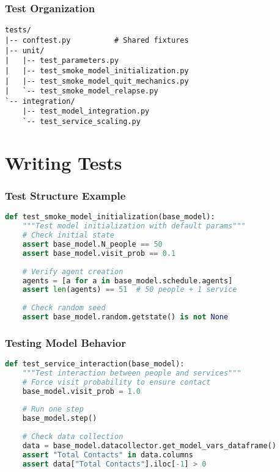 \documentclass{beamer}
\begin{document}
\begin{frame}[fragile]
    \frametitle{Test Organization}
    \begin{lstlisting}[basicstyle=\ttfamily\small]
tests/
|-- conftest.py          # Shared fixtures
|-- unit/
|   |-- test_parameters.py
|   |-- test_smoke_model_initialization.py
|   |-- test_smoke_model_quit_mechanics.py
|   `-- test_smoke_model_relapse.py
`-- integration/
    |-- test_model_integration.py
    `-- test_service_scaling.py
    \end{lstlisting}
\end{frame}

\section{Writing Tests}
\begin{frame}[fragile]
    \frametitle{Test Structure Example}
    \begin{lstlisting}[language=Python]
def test_smoke_model_initialization(base_model):
    """Test model initialization with default params"""
    # Check initial state
    assert base_model.N_people == 50
    assert base_model.visit_prob == 0.1
    
    # Verify agent creation
    agents = [a for a in base_model.schedule.agents]
    assert len(agents) == 51  # 50 people + 1 service
    
    # Check random seed
    assert base_model.random.getstate() is not None
    \end{lstlisting}
\end{frame}

\begin{frame}[fragile]
    \frametitle{Testing Model Behavior}
    \begin{lstlisting}[language=Python]
def test_service_interaction(base_model):
    """Test interaction between people and services"""
    # Force visit probability to ensure contact
    base_model.visit_prob = 1.0
    
    # Run one step
    base_model.step()
    
    # Check data collection
    data = base_model.datacollector.get_model_vars_dataframe()
    assert "Total Contacts" in data.columns
    assert data["Total Contacts"].iloc[-1] > 0
    \end{lstlisting}
\end{frame}
\end{document}
